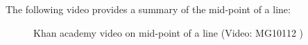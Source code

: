 The following video provides a summary of the mid-point of a line:
\setcounter{subfigure}{0}
\begin{figure}[H] %
\textnormal{Khan academy video on mid-point of a line}\vspace{.1in} \nopagebreak
\label{m39119*yt-media2}\label{m39119*yt-video2}
 { (Video:  MG10112 )}
\vspace{2pt}
\vspace{.1in}
\end{figure}      
%     
%     
% 
